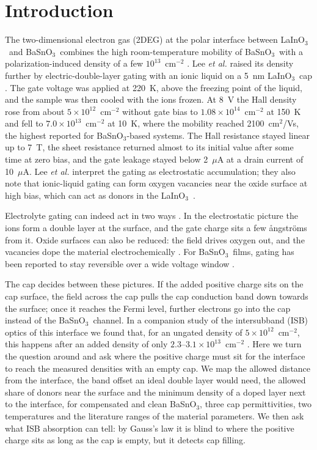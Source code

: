 \documentclass[11pt]{article}
\newcommand{\LIO}{\texorpdfstring{LaInO$_3$}{LaInO3}}
\newcommand{\BSO}{\texorpdfstring{BaSnO$_3$}{BaSnO3}}
\begin{document}
\section{Introduction}
The two-dimensional electron gas (2DEG) at the polar interface between \LIO\ and \BSO\ combines the high room-temperature mobility of \BSO\ with a polarization-induced density of a few $10^{13}$~cm$^{-2}$ \cite{Kim2019LIO,Aggoune2021}. Lee \emph{et al.} raised its density further by electric-double-layer gating with an ionic liquid on a 5~nm \LIO\ cap \cite{Lee2024LIO}. The gate voltage was applied at 220~K, above the freezing point of the liquid, and the sample was then cooled with the ions frozen. At 8~V the Hall density rose from about $5\times10^{12}$~cm$^{-2}$ without gate bias to $1.08\times10^{14}$~cm$^{-2}$ at 150~K and fell to $7.0\times10^{13}$~cm$^{-2}$ at 10~K, where the mobility reached 2100~cm$^2$/Vs, the highest reported for \BSO-based systems. The Hall resistance stayed linear up to 7~T, the sheet resistance returned almost to its initial value after some time at zero bias, and the gate leakage stayed below 2~$\mu$A at a drain current of 10~$\mu$A. Lee \emph{et al.} interpret the gating as electrostatic accumulation; they also note that ionic-liquid gating can form oxygen vacancies near the oxide surface at high bias, which can act as donors in the \LIO\ \cite{Lee2024LIO}.

Electrolyte gating can indeed act in two ways \cite{Ueno2008,Bisri2017}. In the electrostatic picture the ions form a double layer at the surface, and the gate charge sits a few \aa ngstr\"oms from it. Oxide surfaces can also be reduced: the field drives oxygen out, and the vacancies dope the material electrochemically \cite{Jeong2013,Bisri2017}. For \BSO\ films, gating has been reported to stay reversible over a wide voltage window \cite{Wang2019BSO}.

The cap decides between these pictures. If the added positive charge sits on the cap surface, the field across the cap pulls the cap conduction band down towards the surface; once it reaches the Fermi level, further electrons go into the cap instead of the \BSO\ channel. In a companion study of the intersubband (ISB) optics of this interface we found that, for an ungated density of $5\times10^{12}$~cm$^{-2}$, this happens after an added density of only $2.3$--$3.1\times10^{13}$~cm$^{-2}$ \cite{OwnbyMAT01}. Here we turn the question around and ask where the positive charge must sit for the interface to reach the measured densities with an empty cap. We map the allowed distance from the interface, the band offset an ideal double layer would need, the allowed share of donors near the surface and the minimum density of a doped layer next to the interface, for compensated and clean \BSO, three cap permittivities, two temperatures and the literature ranges of the material parameters. We then ask what ISB absorption can tell: by Gauss's law it is blind to where the positive charge sits as long as the cap is empty, but it detects cap filling.
\end{document}

